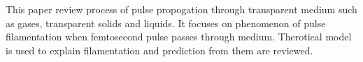 \documentclass[../main.tex]{subfiles}
\begin{document}
	This paper review process of pulse propogation through transparent medium
	such as gases, transparent solids and liquids. It focuses on phenomenon
	of pulse filamentation when femtosecond pulse passes through medium.
	Therotical model is used to explain filamentation and prediction from
	them are reviewed.
\end{document}
